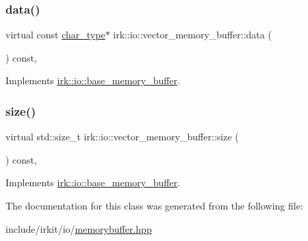 \mbox{\label{classirk_1_1io_1_1vector__memory__buffer_ad0d18022442c081ac51abb8da8b68e54}} 
\subsubsection{\texorpdfstring{data()}{data()}\hspace{0.1cm}{\footnotesize\ttfamily [2/2]}}
{\footnotesize\ttfamily virtual const \mbox{\hyperlink{classirk_1_1io_1_1base__memory__buffer_a1b539180df4274dd4ad0402a0ac821ec}{char\+\_\+type}}$\ast$ irk\+::io\+::vector\+\_\+memory\+\_\+buffer\+::data (\begin{DoxyParamCaption}{ }\end{DoxyParamCaption}) const\hspace{0.3cm}{\ttfamily [inline]}, {\ttfamily [virtual]}}



Implements \mbox{\hyperlink{classirk_1_1io_1_1base__memory__buffer_a87bbff1a6d211e26f0c0aa924a980b9e}{irk\+::io\+::base\+\_\+memory\+\_\+buffer}}.

\mbox{\label{classirk_1_1io_1_1vector__memory__buffer_ab79eda0d916da980b78ecae09883bba1}} 
\subsubsection{\texorpdfstring{size()}{size()}}
{\footnotesize\ttfamily virtual std\+::size\+\_\+t irk\+::io\+::vector\+\_\+memory\+\_\+buffer\+::size (\begin{DoxyParamCaption}{ }\end{DoxyParamCaption}) const\hspace{0.3cm}{\ttfamily [inline]}, {\ttfamily [virtual]}}



Implements \mbox{\hyperlink{classirk_1_1io_1_1base__memory__buffer_ae634ab934981e7e4baf5e1e67ef3b006}{irk\+::io\+::base\+\_\+memory\+\_\+buffer}}.



The documentation for this class was generated from the following file\+:\begin{DoxyCompactItemize}
\item 
include/irkit/io/\mbox{\hyperlink{memorybuffer_8hpp}{memorybuffer.\+hpp}}\end{DoxyCompactItemize}
